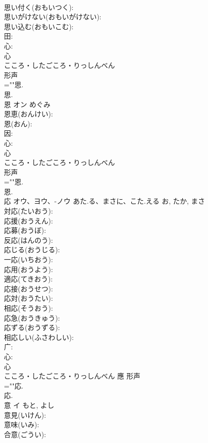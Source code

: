 \documentclass[8pt]{extreport}
\begin{document}
\begin{CJK}{UTF8}{min}
\\	思い付く(おもいつく): 
\\	思いがけない(おもいがけない): 
\\	思い込む(おもいこむ): 
\\	田: 
\\	心: 
\\	心	
\\	こころ・したごころ・りっしんべん	
\\	形声 
\\	=""思.
\\	思.
\\	恩	オン		めぐみ	
\\	恩恵(おんけい): 
\\	恩(おん): 
\\	因: 
\\	心: 
\\	心	
\\	こころ・したごころ・りっしんべん	
\\	形声 
\\	=""恩.
\\	恩.
\\	応	オウ、ヨウ、-ノウ	あた.る、まさに、こた.える	お, たか, まさ	
\\	対応(たいおう): 
\\	応援(おうえん): 
\\	応募(おうぼ): 
\\	反応(はんのう): 
\\	応じる(おうじる): 
\\	一応(いちおう): 
\\	応用(おうよう): 
\\	適応(てきおう): 
\\	応接(おうせつ): 
\\	応対(おうたい): 
\\	相応(そうおう): 
\\	応急(おうきゅう): 
\\	応ずる(おうずる): 
\\	相応しい(ふさわしい): 
\\	广: 
\\	心: 
\\	心	
\\	こころ・したごころ・りっしんべん	應	形声 
\\	=""応.
\\	応.
\\	意	イ		もと, よし	
\\	意見(いけん): 
\\	意味(いみ): 
\\	合意(ごうい): 

\end{CJK}
\end{document}
